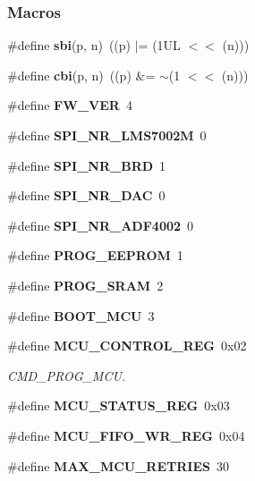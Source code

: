 \subsubsection*{Macros}
\begin{DoxyCompactItemize}
\item 
\#define {\bf sbi}(p,  n)~((p) $\vert$= (1\+U\+L $<$$<$ (n)))
\item 
\#define {\bf cbi}(p,  n)~((p) \&= $\sim$(1 $<$$<$ (n)))
\item 
\#define {\bf F\+W\+\_\+\+V\+ER}~4
\item 
\#define {\bf S\+P\+I\+\_\+\+N\+R\+\_\+\+L\+M\+S7002M}~0
\item 
\#define {\bf S\+P\+I\+\_\+\+N\+R\+\_\+\+B\+RD}~1
\item 
\#define {\bf S\+P\+I\+\_\+\+N\+R\+\_\+\+D\+AC}~0
\item 
\#define {\bf S\+P\+I\+\_\+\+N\+R\+\_\+\+A\+D\+F4002}~0
\item 
\#define {\bf P\+R\+O\+G\+\_\+\+E\+E\+P\+R\+OM}~1
\item 
\#define {\bf P\+R\+O\+G\+\_\+\+S\+R\+AM}~2
\item 
\#define {\bf B\+O\+O\+T\+\_\+\+M\+CU}~3
\item 
\#define {\bf M\+C\+U\+\_\+\+C\+O\+N\+T\+R\+O\+L\+\_\+\+R\+EG}~0x02
\begin{DoxyCompactList}\small\item\em C\+M\+D\+\_\+\+P\+R\+O\+G\+\_\+\+M\+CU. \end{DoxyCompactList}\item 
\#define {\bf M\+C\+U\+\_\+\+S\+T\+A\+T\+U\+S\+\_\+\+R\+EG}~0x03
\item 
\#define {\bf M\+C\+U\+\_\+\+F\+I\+F\+O\+\_\+\+W\+R\+\_\+\+R\+EG}~0x04
\item 
\#define {\bf M\+A\+X\+\_\+\+M\+C\+U\+\_\+\+R\+E\+T\+R\+I\+ES}~30
\end{DoxyCompactItemize}
